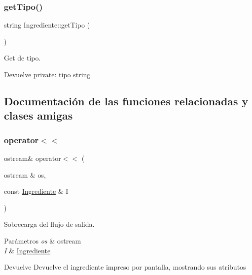 \subsubsection{\texorpdfstring{get\+Tipo()}{getTipo()}}
{\footnotesize\ttfamily string Ingrediente\+::get\+Tipo (\begin{DoxyParamCaption}{ }\end{DoxyParamCaption})}



Get de tipo. 

\begin{DoxyReturn}{Devuelve}
private\+: tipo string 
\end{DoxyReturn}


\subsection{Documentación de las funciones relacionadas y clases amigas}
\mbox{\label{classIngrediente_a8eb17567275c9321807798349e3e3f28}} 
\subsubsection{\texorpdfstring{operator$<$$<$}{operator<<}}
{\footnotesize\ttfamily ostream\& operator$<$$<$ (\begin{DoxyParamCaption}\item[{ostream \&}]{os,  }\item[{const \hyperlink{classIngrediente}{Ingrediente} \&}]{I }\end{DoxyParamCaption})\hspace{0.3cm}{\ttfamily [friend]}}



Sobrecarga del flujo de salida. 


\begin{DoxyParams}{Parámetros}
{\em os} & ostream \\
\hline
{\em I} & \hyperlink{classIngrediente}{Ingrediente} \\
\hline
\end{DoxyParams}
\begin{DoxyReturn}{Devuelve}
Devuelve el ingrediente impreso por pantalla, mostrando sus atributos 
\end{DoxyReturn}
\mbox{\label{classIngrediente_a99ca935915d4c00d502b976cf4b9f4df}} 
